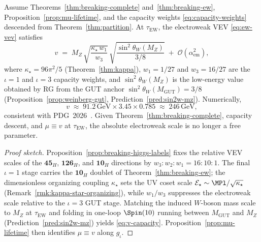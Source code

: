 \begin{theorem}\label{thm:ew-scale-value}
Assume Theorems~\ref{thm:breaking-complete} and~\ref{thm:breaking-ew},
Proposition~\ref{prop:mu-lifetime}, and the capacity weights
\eqref{eq:capacity-weights} descended from Theorem~\ref{thm:partition}.
At $\tau_{\mathrm{EW}}$, the electroweak VEV \eqref{eq:ew-vev} satisfies
\begin{equation}\label{eq:v-capacity}
  v
  \;=\;
  M_Z\,
  \sqrt{\frac{\kappa_\star\,w_1}{w_3}}\,
  \sqrt{\frac{\sin^2\theta_W(M_Z)}{3/8}}
  \;+\;\mathcal{O}(\alpha_{\mathrm{em}}^2),
\end{equation}
where $\kappa_\star=96\pi^2/5$ (Theorem~\ref{thm:kappa}),
$w_1=1/27$ and $w_3=16/27$ are the $\iota=1$ and $\iota=3$ capacity weights,
and $\sin^2\theta_W(M_Z)$ is the low-energy value obtained by RG from the GUT
anchor $\sin^2\theta_W(M_{\mathrm{GUT}})=3/8$
(Proposition~\ref{prop:weinberg-gut}, Prediction~\ref{pred:sin2w-mz}).
Numerically,
\begin{equation}\label{eq:v-numeric}
  v
  \;\approx\;
  91.2\,\mathrm{GeV}\times 3.45\times 0.785
  \;\approx\;
  246\,\mathrm{GeV},
\end{equation}
consistent with PDG~2026~\cite{PDG2025}. Given Theorem~\ref{thm:breaking-complete}, capacity descent, and
$\mu\equiv v$ at $\tau_{\mathrm{EW}}$, the absolute electroweak scale is no
longer a free parameter.
\end{theorem}

\begin{proof}[Proof sketch]
Proposition~\ref{prop:breaking-higgs-labels} fixes the relative VEV scales of
the $\mathbf{45}_H$, $\mathbf{126}_H$, and $\mathbf{10}_H$ directions by
$w_3:w_2:w_1=16:10:1$. The final $\iota=1$ stage carries the
$\mathbf{10}_H$ doublet of Theorem~\ref{thm:breaking-ew}; the dimensionless
organizing coupling $\kappa_\star$ sets the UV coset scale
$\mathcal{E}_\star\sim\MPl/\sqrt{\kappa_\star}$ (Remark~\ref{rmk:kappa-star-organizing}),
while $w_1/w_3$ suppresses the electroweak scale relative to the
$\iota=3$ GUT stage. Matching the induced $W$-boson mass scale to $M_Z$ at
$\tau_{\mathrm{EW}}$ and folding in one-loop $\Spin(10)$ running between
$M_{\mathrm{GUT}}$ and $M_Z$ (Prediction~\ref{pred:sin2w-mz}) yields
\eqref{eq:v-capacity}. Proposition~\ref{prop:mu-lifetime} then identifies
$\mu\equiv v$ along $g_\iota$.
\end{proof}

